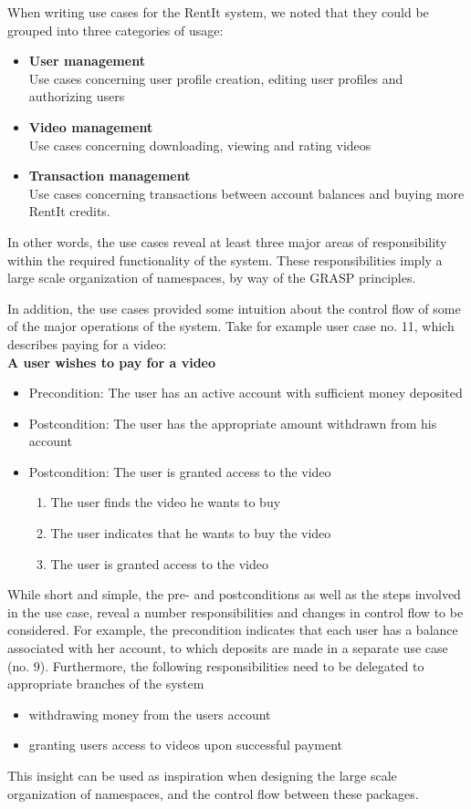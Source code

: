 When writing use cases for the RentIt system, we noted that they could be grouped into three categories of usage:
\begin{itemize}
\item \textbf{User management}\\
Use cases concerning user profile creation, editing user profiles and authorizing users
\item \textbf{Video management}\\
Use cases concerning downloading, viewing and rating videos
\item \textbf{Transaction management}\\
Use cases concerning transactions between account balances and buying more RentIt credits.
\end{itemize}
In other words, the use cases reveal at least three major areas of responsibility within the required functionality of the system. These responsibilities imply a large scale organization of namespaces, by way of the GRASP principles.

In addition, the use cases provided some intuition about the control flow of some of the major operations of the system. Take for example user case no. 11, which describes paying for a video:\\

\textbf{A user wishes to pay for a video}
\begin{itemize}
	\item Precondition: The user has an active account with sufficient money deposited
	\item Postcondition: The user has the appropriate amount withdrawn from his 				account
	\item Postcondition: The user is granted access to the video
	\begin{enumerate}
		\item The user finds the video he wants to buy
		\item The user indicates that he wants to buy the video
		\item The user is granted access to the video
	\end{enumerate}
\end{itemize}

While short and simple, the pre- and postconditions as well as the steps involved in the use case, reveal a number responsibilities and changes in control flow to be considered. For example, the precondition indicates that each user has a balance associated with her account, to which deposits are made  in a separate use case (no. 9). Furthermore, the following responsibilities need to be delegated to appropriate branches of the system
\begin{itemize}
\item withdrawing money from the users account
\item granting users access to videos upon successful payment
\end{itemize}
This insight can be used as inspiration when designing the large scale organization of namespaces, and the control flow between these packages.

